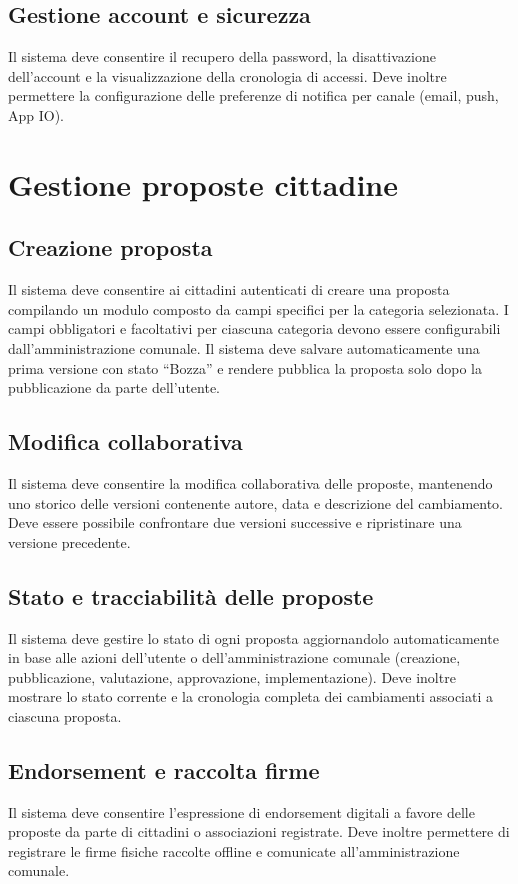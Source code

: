 \subsection{Gestione account e sicurezza}
Il sistema deve consentire il recupero della password, la disattivazione dell’account e la visualizzazione della cronologia di accessi.  
Deve inoltre permettere la configurazione delle preferenze di notifica per canale (email, push, App IO).

\section{Gestione proposte cittadine}

\subsection{Creazione proposta}
Il sistema deve consentire ai cittadini autenticati di creare una proposta compilando un modulo composto da campi specifici per la categoria selezionata.  
I campi obbligatori e facoltativi per ciascuna categoria devono essere configurabili dall’amministrazione comunale.  
Il sistema deve salvare automaticamente una prima versione con stato “Bozza” e rendere pubblica la proposta solo dopo la pubblicazione da parte dell’utente.

\subsection{Modifica collaborativa}
Il sistema deve consentire la modifica collaborativa delle proposte, mantenendo uno storico delle versioni contenente autore, data e descrizione del cambiamento.  
Deve essere possibile confrontare due versioni successive e ripristinare una versione precedente.

\subsection{Stato e tracciabilità delle proposte}
Il sistema deve gestire lo stato di ogni proposta aggiornandolo automaticamente in base alle azioni dell’utente o dell’amministrazione comunale (creazione, pubblicazione, valutazione, approvazione, implementazione).  
Deve inoltre mostrare lo stato corrente e la cronologia completa dei cambiamenti associati a ciascuna proposta.

\subsection{Endorsement e raccolta firme}
Il sistema deve consentire l’espressione di endorsement digitali a favore delle proposte da parte di cittadini o associazioni registrate.  
Deve inoltre permettere di registrare le firme fisiche raccolte offline e comunicate all’amministrazione comunale.

